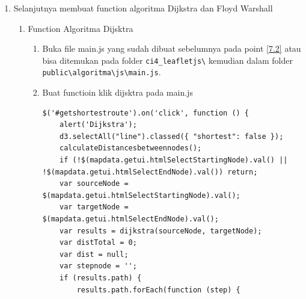 \begin{enumerate}
\begin{lstlisting}[caption=index.php Full Code]
    <div class="pcoded-content">
      <div class="pcoded-inner-content">
        <div class="main-body">
          <div class="page-wrapper">
            <div class="page-header card">
              <div class="row align-items-start">
                <div class="col-lg-8">
                  <div class="page-header-title">        
                    &copy; Faisal Syarifuddin <?php echo date('Y') ?>
                    <br>CodeIgniter Version <?= CodeIgniter\CodeIgniter::CI_VERSION ?>
                  </div>
                </div>
              </div>
            </div>
          </div>
        </div>
      </div>
    </div>

  </div>

  <script src="https://code.jquery.com/jquery-3.2.1.min.js"></script>
  <script src="https://cdnjs.cloudflare.com/ajax/libs/popper.js/1.11.0/umd/popper.min.js" integrity="sha384-b/U6ypiBEHpOf/4+1nzFpr53nxSS+GLCkfwBdFNTxtclqqenISfwAzpKaMNFNmj4" crossorigin="anonymous"></script>
  <script src="https://maxcdn.bootstrapcdn.com/bootstrap/4.0.0-beta/js/bootstrap.min.js" integrity="sha384-h0AbiXch4ZDo7tp9hKZ4TsHbi047NrKGLO3SEJAg45jXxnGIfYzk4Si90RDIqNm1" crossorigin="anonymous"></script>
  <script src="https://cdn.jsdelivr.net/npm/d3@3.3.0/d3.min.js"></script>
  <script src="https://cdn.jsdelivr.net/npm/leaflet@0.7.7/dist/leaflet.js"></script>

  <script src="/algoritma/js/main.js"></script>
  <script src="/algoritma/js/ie10-viewport-bug-workaround.js"></script>
  <script type="text/javascript" src="/js/script.js"></script>

</body>
</html>
\end{lstlisting}

    \item Selanjutnya membuat function algoritma Dijkstra dan Floyd Warshall
    \begin{enumerate}
        \item Function Algoritma Dijsktra
    \begin{enumerate}
        \item Buka file main.js yang sudah dibuat sebelumnya pada point \ref{7.2} atau bisa ditemukan pada folder \verb|ci4_leafletjs\| kemudian dalam folder \verb|public\algoritma\js\main.js|.
        \item Buat functioin klik dijsktra pada main.js
\begin{lstlisting}[caption=Function OnClick Dijsktra]
$('#getshortestroute').on('click', function () {
    alert('Dijkstra');
    d3.selectAll("line").classed({ "shortest": false });
    calculateDistancesbetweennodes();
    if (!$(mapdata.getui.htmlSelectStartingNode).val() || !$(mapdata.getui.htmlSelectEndNode).val()) return;
    var sourceNode = $(mapdata.getui.htmlSelectStartingNode).val();
    var targetNode = $(mapdata.getui.htmlSelectEndNode).val();
    var results = dijkstra(sourceNode, targetNode);
    var distTotal = 0;
    var dist = null;
    var stepnode = '';
    if (results.path) {
        results.path.forEach(function (step) {


\end{lstlisting}
\end{enumerate}
\end{enumerate}
\end{enumerate}

